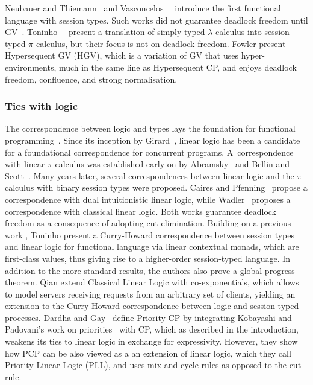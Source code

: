 Neubauer and Thiemann~\cite{neubauert04} and Vasconcelos~\etal~\cite{vasconcelosravara04,vasconcelosgay06} introduce the first functional language with session types. Such works did not guarantee deadlock freedom until GV~\cite{lindleymorris15,wadler14}.
Toninho~\etal~\cite{toninhocaires12} present a translation of simply-typed $\lambda$-calculus into session-typed $\pi$-calculus, but their focus is not on deadlock freedom.
Fowler \etal \cite{fowleretal21} present Hypersequent GV (HGV), which is a variation of GV that uses hyper-environments, much in the same line as Hypersequent CP, and enjoys deadlock freedom, confluence, and strong normalisation.

\subsubsection*{Ties with logic}
The correspondence between logic and types lays the foundation for functional programming~\cite{wadler15}.
Since its inception by Girard~\cite{girard87}, linear logic has been a candidate for a foundational correspondence for concurrent programs.
A~correspondence with linear $\pi$-calculus was established early on by Abramsky~\cite{abramsky94} and Bellin and Scott~\cite{bellinscott94}. Many years later, several correspondences between linear logic and the $\pi$-calculus with binary session types were proposed. Caires and Pfenning~\cite{cairespfenning10} propose a correspondence with dual intuitionistic linear logic, while Wadler~\cite{wadler12} proposes a correspondence with classical linear logic. Both works guarantee deadlock freedom as a consequence of adopting cut elimination.
Building on a previous work \cite{cairespfenning10}, Toninho \etal \cite{toninhoetal13} present a Curry-Howard correspondence between session types and linear logic for functional language via linear contextual monads, which are first-class values, thus giving rise to a higher-order session-typed  language. In addition to the more standard results, the authors also prove a global progress theorem.
Qian \etal \cite{QianKB21} extend Classical Linear Logic with co-exponentials, which allows to model servers receiving requests from an arbitrary set of clients, yielding an extension to the Curry-Howard correspondence between logic and session typed processes.
Dardha and Gay~\cite{dardhagay18extended} define Priority CP by integrating Kobayashi and Padovani's work on priorities~\cite{kobayashi06,padovani14} with CP, which as described in the introduction, weakens its ties to linear logic in exchange for expressivity. However, they show how PCP can be also {viewed as} a an extension of linear logic, which they call Priority Linear Logic (PLL), and uses mix and cycle rules as opposed to the cut rule.

